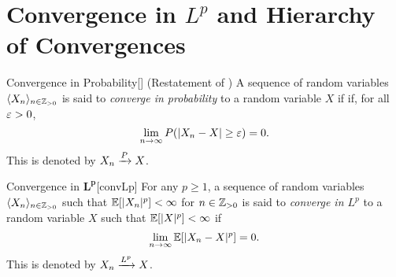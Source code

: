 \documentclass[../probability.tex]{subfiles}
\begin{document}
\section{Convergence in \texorpdfstring{$L^p$}{L\^{}p} and Hierarchy of Convergences}

\begin{Definition}{Convergence in Probability}[]
    (Restatement of )
    A sequence of random variables \(\lang X_n \rang_{n \in \ZZ_{>0}}\) is said to
    \emph{converge in probability} to a random variable \(X\) if
    if, for all \(\varepsilon > 0\),
    \[
        \lim_{n \to \infty} P(|X_n - X| \ge \varepsilon) = 0\text.
    \]
    This is denoted by \(X_n \xrightarrow{P} X\).
\end{Definition}

\begin{Definition}{Convergence in \(\bm{L^p}\)}[convLp]
    For any \(p \ge 1\), a sequence of random variables \(\lang X_n \rang_{n \in \ZZ_{>0}}\)
    such that \(\mathbb{E}[|X_n|^p] < \infty\) for \(n \in \ZZ_{>0}\)
    is said to \emph{converge in \(L^p\)} to a random variable \(X\)
    such that \(\mathbb{E}[|X|^p] < \infty\) if
    \[
        \lim_{n \to \infty} \mathbb{E}[|X_n - X|^p] = 0\text.
    \]
    This is denoted by \(X_n \xrightarrow{L^p} X\).
\end{Definition}
\end{document}
